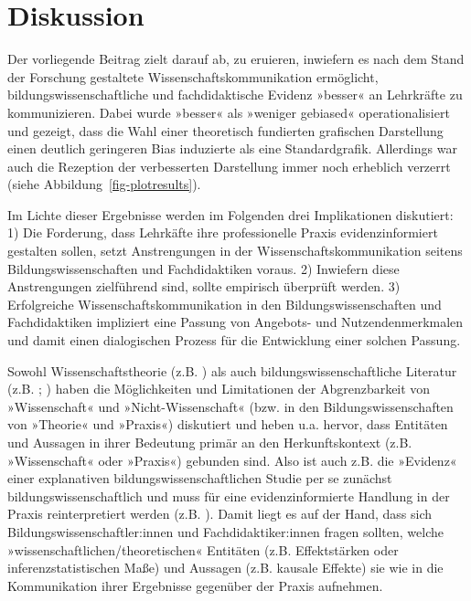 \documentclass[
  jou,
  floatsintext,
  longtable,
  nolmodern,
  notxfonts,
  notimes,
  colorlinks=true,linkcolor=blue,citecolor=blue,urlcolor=blue]{apa7}
\begin{document}
\section{Diskussion}\label{diskussion}

Der vorliegende Beitrag zielt darauf ab, zu eruieren, inwiefern es nach
dem Stand der Forschung gestaltete Wissenschaftskommunikation
ermöglicht, bildungswissenschaftliche und fachdidaktische Evidenz
»besser« an Lehrkräfte zu kommunizieren. Dabei wurde »besser« als
»weniger gebiased« operationalisiert und gezeigt, dass die Wahl einer
theoretisch fundierten grafischen Darstellung einen deutlich geringeren
Bias induzierte als eine Standardgrafik. Allerdings war auch die
Rezeption der verbesserten Darstellung immer noch erheblich verzerrt
(siehe Abbildung~\ref{fig-plotresults}).

Im Lichte dieser Ergebnisse werden im Folgenden drei Implikationen
diskutiert: 1) Die Forderung, dass Lehrkäfte ihre professionelle Praxis
evidenzinformiert gestalten sollen, setzt Anstrengungen in der
Wissenschaftskommunikation seitens Bildungswissenschaften und
Fachdidaktiken voraus. 2) Inwiefern diese Anstrengungen zielführend
sind, sollte empirisch überprüft werden. 3) Erfolgreiche
Wissenschaftskommunikation in den Bildungswissenschaften und
Fachdidaktiken impliziert eine Passung von Angebots- und
Nutzendenmerkmalen und damit einen dialogischen Prozess für die
Entwicklung einer solchen Passung.

Sowohl Wissenschaftstheorie (z.B. ) als auch bildungswissenschaftliche Literatur (z.B.
; ) haben die Möglichkeiten und Limitationen der
Abgrenzbarkeit von »Wissenschaft« und »Nicht-Wissenschaft« (bzw. in den
Bildungswissenschaften von »Theorie« und »Praxis«) diskutiert und heben
u.a. hervor, dass Entitäten und Aussagen in ihrer Bedeutung primär an
den Herkunftskontext (z.B. »Wissenschaft« oder »Praxis«) gebunden sind.
Also ist auch z.B. die »Evidenz« einer explanativen
bildungswissenschaftlichen Studie per se zunächst
bildungswissenschaftlich und muss für eine evidenzinformierte Handlung
in der Praxis reinterpretiert werden (z.B.
). Damit liegt
es auf der Hand, dass sich Bildungswissenschaftler:innen und
Fachdidaktiker:innen fragen sollten, welche
»wissenschaftlichen/theoretischen« Entitäten (z.B. Effektstärken oder
inferenzstatistischen Maße) und Aussagen (z.B. kausale Effekte) sie wie
in die Kommunikation ihrer Ergebnisse gegenüber der Praxis aufnehmen.
\end{document}
